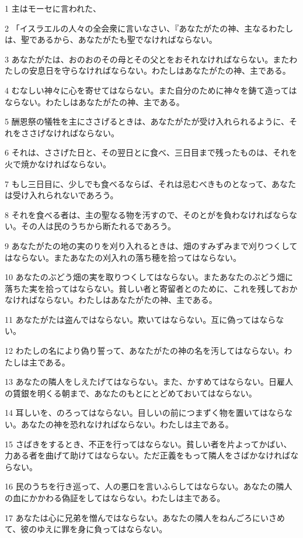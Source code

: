 \par 1 主はモーセに言われた、
\par 2 「イスラエルの人々の全会衆に言いなさい、『あなたがたの神、主なるわたしは、聖であるから、あなたがたも聖でなければならない。
\par 3 あなたがたは、おのおのその母とその父とをおそれなければならない。またわたしの安息日を守らなければならない。わたしはあなたがたの神、主である。
\par 4 むなしい神々に心を寄せてはならない。また自分のために神々を鋳て造ってはならない。わたしはあなたがたの神、主である。
\par 5 酬恩祭の犠牲を主にささげるときは、あなたがたが受け入れられるように、それをささげなければならない。
\par 6 それは、ささげた日と、その翌日とに食べ、三日目まで残ったものは、それを火で焼かなければならない。
\par 7 もし三日目に、少しでも食べるならば、それは忌むべきものとなって、あなたは受け入れられないであろう。
\par 8 それを食べる者は、主の聖なる物を汚すので、そのとがを負わなければならない。その人は民のうちから断たれるであろう。
\par 9 あなたがたの地の実のりを刈り入れるときは、畑のすみずみまで刈りつくしてはならない。またあなたの刈入れの落ち穂を拾ってはならない。
\par 10 あなたのぶどう畑の実を取りつくしてはならない。またあなたのぶどう畑に落ちた実を拾ってはならない。貧しい者と寄留者とのために、これを残しておかなければならない。わたしはあなたがたの神、主である。
\par 11 あなたがたは盗んではならない。欺いてはならない。互に偽ってはならない。
\par 12 わたしの名により偽り誓って、あなたがたの神の名を汚してはならない。わたしは主である。
\par 13 あなたの隣人をしえたげてはならない。また、かすめてはならない。日雇人の賃銀を明くる朝まで、あなたのもとにとどめておいてはならない。
\par 14 耳しいを、のろってはならない。目しいの前につまずく物を置いてはならない。あなたの神を恐れなければならない。わたしは主である。
\par 15 さばきをするとき、不正を行ってはならない。貧しい者を片よってかばい、力ある者を曲げて助けてはならない。ただ正義をもって隣人をさばかなければならない。
\par 16 民のうちを行き巡って、人の悪口を言いふらしてはならない。あなたの隣人の血にかかわる偽証をしてはならない。わたしは主である。
\par 17 あなたは心に兄弟を憎んではならない。あなたの隣人をねんごろにいさめて、彼のゆえに罪を身に負ってはならない。
